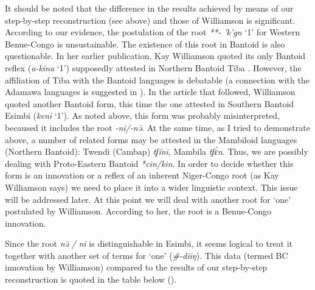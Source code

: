 It should be noted that the difference in the results achieved by means of our step-by-step reconstruction (see above) and those of Williamson is significant. According to our evidence, the postulation of the root \textit{**-} \textit{'k{}'g{}n{}} ‘1’ for Western Benue-Congo is unsustainable. The existence of this root in Bantoid is also questionable. In her earlier publication, Kay Williamson quoted its only Bantoid reflex (\textit{a-kina} ‘1’) supposedly attested in Northern Bantoid Tiba \citep[255]{Williamson1989b}. However, the affiliation of Tiba with the Bantoid languages is debatable (a connection with the Adamawa languages is suggested in \citealt{Boyd1999}). In the article that followed, Williamson quoted another Bantoid form, this time the one attested in Southern Bantoid Esimbi (\textit{keni} ‘1’). As noted above, this form was probably misinterpreted, becaused it includes the root \textit{-ni/-n{\={ə}}}. At the same time, as I tried to demonstrate above, a number of related forms may be attested in the Mambiloid languages (Northern Bantoid): Twendi (Cambap) \textit{tʃínī}, Mambila \textit{tʃ{\'{ɛ}}n}. Thus, we are possibly dealing with Proto-Eastern Bantoid \textit{*cin/kin}. In order to decide whether this form is an innovation or a reflex of an inherent Niger-Congo root (as Kay Williamson says) we need to place it into a wider linguistic context. This issue will be addressed later. At this point we will deal with another root for ‘one’ postulated by Williamson. According to her, the root is a Benue-Congo innovation.

\largerpage
Since the root \textit{n{\={ə}}} \textit{/} \textit{ni} is distinguishable in Esimbi, it seems logical to treat it together with another set of terms for ‘one’ (\textit{\#-diiŋ}). This data (termed BC innovation by Williamson) compared to the results of our step-by-step reconstruction is quoted in the table below ().

